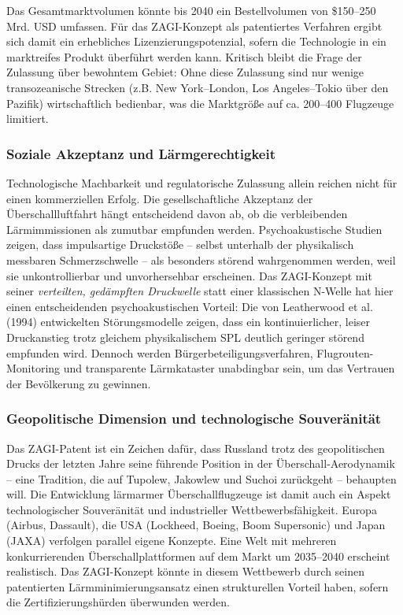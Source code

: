 ﻿\documentclass[12pt,a4paper]{article}
\theoremstyle{definition}
\theoremstyle{remark}
\begin{document}
Das Gesamtmarktvolumen könnte bis 2040 ein Bestellvolumen von \$150--250 Mrd. USD
umfassen. Für das ZAGI-Konzept als patentiertes Verfahren ergibt sich damit
ein erhebliches Lizenzierungspotenzial, sofern die Technologie in ein marktreifes
Produkt überführt werden kann. Kritisch bleibt die Frage der Zulassung über bewohntem Gebiet:
Ohne diese Zulassung sind nur wenige transozeanische Strecken (z.B. New York--London,
Los Angeles--Tokio über den Pazifik) wirtschaftlich bedienbar, was die Marktgröße auf
ca. 200--400 Flugzeuge limitiert.

\subsubsection{Soziale Akzeptanz und Lärmgerechtigkeit}

Technologische Machbarkeit und regulatorische Zulassung allein reichen nicht für einen
kommerziellen Erfolg. Die gesellschaftliche Akzeptanz der Überschallluftfahrt hängt
entscheidend davon ab, ob die verbleibenden Lärmimmissionen als zumutbar empfunden werden.
Psychoakustische Studien zeigen, dass impulsartige Druckstöße -- selbst unterhalb der
physikalisch messbaren Schmerzschwelle -- als besonders störend wahrgenommen werden,
weil sie unkontrollierbar und unvorhersehbar erscheinen. Das ZAGI-Konzept mit seiner
\emph{verteilten, gedämpften Druckwelle} statt einer klassischen N-Welle hat hier
einen entscheidenden psychoakustischen Vorteil: Die von Leatherwood et al. (1994)
entwickelten Störungsmodelle zeigen, dass ein kontinuierlicher, leiser Druckanstieg
trotz gleichem physikalischem SPL deutlich geringer störend empfunden wird.
Dennoch werden Bürgerbeteiligungsverfahren, Flugrouten-Monitoring und transparente
Lärmkataster unabdingbar sein, um das Vertrauen der Bevölkerung zu gewinnen.

\subsubsection{Geopolitische Dimension und technologische Souveränität}

Das ZAGI-Patent ist ein Zeichen dafür, dass Russland trotz des geopolitischen Drucks
der letzten Jahre seine führende Position in der Überschall-Aerodynamik -- eine Tradition,
die auf Tupolew, Jakowlew und Suchoi zurückgeht -- behaupten will. Die Entwicklung
lärmarmer Überschallflugzeuge ist damit auch ein Aspekt technologischer Souveränität
und industrieller Wettbewerbsfähigkeit. Europa (Airbus, Dassault), die USA (Lockheed,
Boeing, Boom Supersonic) und Japan (JAXA) verfolgen parallel eigene Konzepte.
Eine Welt mit mehreren konkurrierenden Überschallplattformen auf dem Markt um 2035--2040
erscheint realistisch. Das ZAGI-Konzept könnte in diesem Wettbewerb durch seinen
patentierten Lärmminimierungsansatz einen strukturellen Vorteil haben, sofern die
Zertifizierungshürden überwunden werden.
\end{document}
